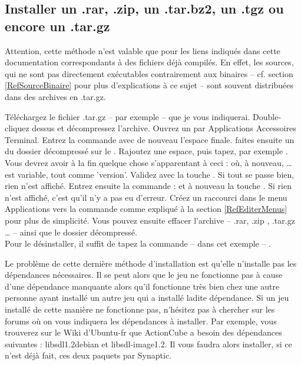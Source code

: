 \subsection{Installer un .rar, .zip, un .tar.bz2, un .tgz ou encore un .tar.gz}
\begin{nota}
Attention, cette méthode n'est valable que pour les liens indiqués dans cette documentation correspondants à des fichiers déjà compilés. En effet, les sources, qui ne sont pas directement exécutables contrairement aux binaires -- cf. section \ref{RefSourceBinaire} pour plus d'explications à ce sujet -- sont souvent distribuées dans des archives en .tar.gz.
\end{nota}
Téléchargez le fichier .tar.gz -- par exemple -- que je vous indiquerai. Double-cliquez dessus et décompressez l'archive. Ouvrez un  par Applications \FlecheDroite Accessoires \FlecheDroite Terminal. Entrez la commande  avec de nouveau l'espace finale. faites ensuite un  du dossier décompressé sur le . Rajoutez une espace, puis tapez, par exemple . Vous devrez avoir à la fin quelque chose s'apparentant à ceci :  où, à nouveau, \ldots{} est variable, tout comme 'version'. Validez avec la touche . Si tout se passe bien, rien n'est affiché. Entrez ensuite la commande :  et à nouveau la touche . Si rien n'est affiché, c'est qu'il n'y a pas eu d'erreur. Créez un raccourci dans le menu Applications vers la commande  comme expliqué à la section \ref{RefEditerMenus} pour plus de simplicité. Vous pouvez ensuite effacer l'archive -- .rar, .zip , .tar.gz \ldots{} -- ainsi que le dossier décompressé.\\
Pour le désinstaller, il suffit de tapez la commande -- dans cet exemple -- .
\begin{nota}
Le problème de cette dernière méthode d'installation est qu'elle n'installe pas les dépendances nécessaires. Il se peut alors que le jeu ne fonctionne pas à cause d'une dépendance manquante alors qu'il fonctionne très bien chez une autre personne ayant installé un autre jeu qui a installé ladite dépendance. Si un jeu installé de cette manière ne fonctionne pas, n'hésitez pas à chercher sur les forums où on vous indiquera les dépendances à installer. Par exemple, vous trouverez sur le Wiki d'Ubuntu-fr que ActionCube a besoin des dépendances suivantes : libsdl1.2debian et libsdl-image1.2. Il vous faudra alors installer, si ce n'est déjà fait, ces deux paquets par Synaptic.
\end{nota}
